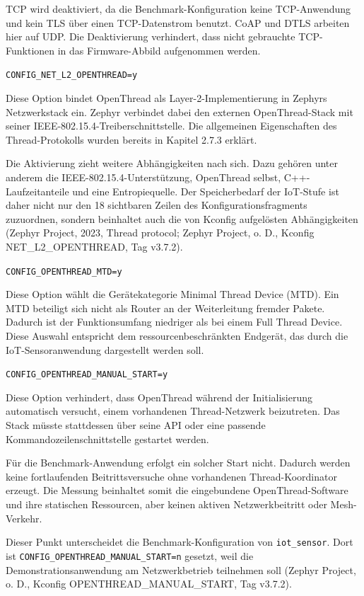 TCP wird deaktiviert, da die Benchmark-Konfiguration keine TCP-Anwendung und kein TLS {\"u}ber einen TCP-Datenstrom benutzt. CoAP und DTLS arbeiten hier auf UDP. Die Deaktivierung verhindert, dass nicht gebrauchte TCP-Funktionen in das Firmware-Abbild aufgenommen werden.

\lstinline[style=codeinline]|CONFIG_NET_L2_OPENTHREAD=y|

Diese Option bindet OpenThread als Layer-2-Implementierung in Zephyrs Netzwerkstack ein. Zephyr verbindet dabei den externen OpenThread-Stack mit seiner IEEE-802.15.4-Treiberschnittstelle. Die allgemeinen Eigenschaften des Thread-Protokolls wurden bereits in Kapitel 2.7.3 erkl{\"a}rt.

Die Aktivierung zieht weitere Abh{\"a}ngigkeiten nach sich. Dazu geh{\"o}ren unter anderem die IEEE-802.15.4-Unterst{\"u}tzung, OpenThread selbst, C++-Laufzeitanteile und eine Entropiequelle. Der Speicherbedarf der IoT-Stufe ist daher nicht nur den 18 sichtbaren Zeilen des Konfigurationsfragments zuzuordnen, sondern beinhaltet auch die von Kconfig aufgel{\"o}sten Abh{\"a}ngigkeiten (Zephyr Project, 2023, \glqq{}Thread protocol\grqq{}; Zephyr Project, o. D., Kconfig NET\_L2\_OPENTHREAD, Tag v3.7.2).

\lstinline[style=codeinline]|CONFIG_OPENTHREAD_MTD=y|

Diese Option w{\"a}hlt die Ger{\"a}tekategorie Minimal Thread Device (MTD). Ein MTD beteiligt sich nicht als Router an der Weiterleitung fremder Pakete. Dadurch ist der Funktionsumfang niedriger als bei einem Full Thread Device. Diese Auswahl entspricht dem ressourcenbeschr{\"a}nkten Endger{\"a}t, das durch die IoT-Sensoranwendung dargestellt werden soll.

\lstinline[style=codeinline]|CONFIG_OPENTHREAD_MANUAL_START=y|

Diese Option verhindert, dass OpenThread w{\"a}hrend der Initialisierung automatisch versucht, einem vorhandenen Thread-Netzwerk beizutreten. Das Stack m{\"u}sste stattdessen {\"u}ber seine API oder eine passende Kommandozeilenschnittstelle gestartet werden.

F{\"u}r die Benchmark-Anwendung erfolgt ein solcher Start nicht. Dadurch werden keine fortlaufenden Beitrittsversuche ohne vorhandenen Thread-Koordinator erzeugt. Die Messung beinhaltet somit die eingebundene OpenThread-Software und ihre statischen Ressourcen, aber keinen aktiven Netzwerkbeitritt oder Mesh-Verkehr.

Dieser Punkt unterscheidet die Benchmark-Konfiguration von \lstinline[style=codeinline]|iot_sensor|. Dort ist \lstinline[style=codeinline]|CONFIG_OPENTHREAD_MANUAL_START=n| gesetzt, weil die Demonstrationsanwendung am Netzwerkbetrieb teilnehmen soll (Zephyr Project, o. D., Kconfig OPENTHREAD\_MANUAL\_START, Tag v3.7.2).

